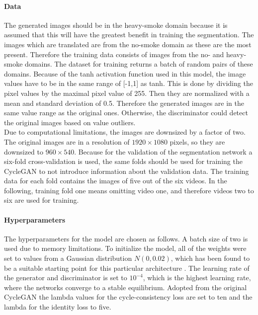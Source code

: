 \paragraph*{Data} 
The generated images should be in the heavy-smoke domain because it is assumed that this will have the greatest benefit in training the segmentation.
The images which are translated are from the no-smoke domain as these are the most present.
Therefore the training data consists of images from the no- and heavy-smoke domains.
The dataset for training returns a batch of random pairs of these domains.
Because of the tanh activation function used in this model, the image values have to be in the same range of [-1,1] as tanh.
This is done by dividing the pixel values by the maximal pixel value of 255.
Then they are normalized with a mean and standard deviation of 0.5.
Therefore the generated images are in the same value range as the original ones.
Otherwise, the discriminator could detect the original images based on value outliers.\\
Due to computational limitations, the images are downsized by a factor of two.
The original images are in a resolution of $1920\times1080$ pixels, so they are downsized to $960\times540$.
Because for the validation of the segmentation network a six-fold cross-validation is used, the same folds should be used for training the CycleGAN to not introduce information about the validation data.
The training data for each fold contains the images of five out of the six videos.
In the following, training fold one means omitting video one, and therefore videos two to six are used for training. 
\paragraph{Hyperparameters} The hyperparameters for the model are chosen as follows.
A batch size of two is used due to memory limitations.
To initialize the model, all of the weights were set to values from a Gaussian distribution $N(0, 0.02)$, which has been found to be a suitable starting point for this particular architecture \cite{Zhu2017}.
The learning rate of the generator and discriminator is set to $10^{-4}$, which is the highest learning rate, where the networks converge to a stable equilibrium. 
Adopted from the original CycleGAN the lambda values for the cycle-consistency loss are set to ten and the lambda for the identity loss to five.\\
